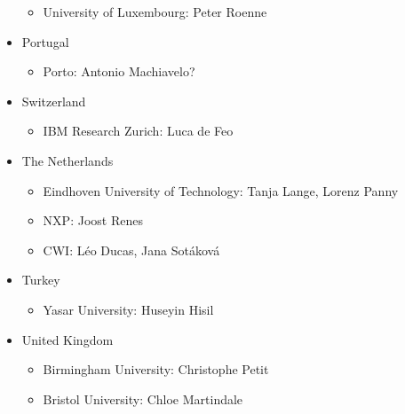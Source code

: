 \documentclass{article}
\begin{document}
\begin{itemize}
		\begin{itemize}
			\item {\red University of Luxembourg: Peter Roenne}
		\end{itemize}
	\item Portugal
		\begin{itemize}
			\item {\red Porto: Antonio Machiavelo?}
		\end{itemize}
	\item Switzerland
		\begin{itemize}
			\item IBM Research Zurich: Luca de Feo
		\end{itemize}
	\item The Netherlands
		\begin{itemize}
			\item Eindhoven University of Technology: Tanja Lange, Lorenz Panny
			\item {\red NXP: Joost Renes}
			\item {\red CWI: L\'{e}o Ducas, Jana Sot\'{a}kov\'{a}}
		\end{itemize}
	\item Turkey
		\begin{itemize}
			\item Yasar University: Huseyin Hisil
		\end{itemize}
	\item United Kingdom
		\begin{itemize}
			\item Birmingham University: Christophe Petit
			\item Bristol University: Chloe Martindale
		\end{itemize}
\end{itemize}



\end{document}
